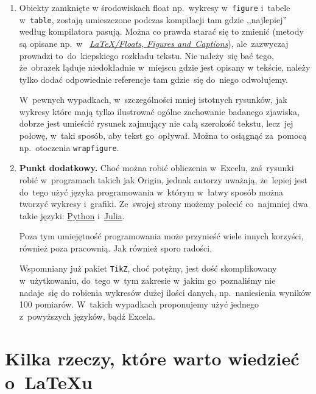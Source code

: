 \documentclass[a4paper,11pt]{article}
\begin{document}
\begin{enumerate}
\item Obiekty zamknięte w środowiskach float np.~wykresy
  w~\texttt{figure} i~tabele w~\texttt{table}, zostają umieszczone
  podczas kompilacji tam gdzie ,,najlepiej'' według kompilatora
  pasują. Można co prawda starać się to zmienić (metody są opisane
  np.~w~
  \href{https://en.wikibooks.org/wiki/LaTeX/Floats,\_Figures\_and\_Captions}{\emph{\LaTeX/Floats,
      Figures and~Captions}}), ale~zazwyczaj prowadzi to~do~kiepskiego
  rozkładu tekstu. Nie należy~się bać tego, że~obrazek ląduje
  niedokładnie w~miejscu gdzie jest opisany w tekście, należy tylko
  dodać odpowiednie referencje tam gdzie~się do~niego odwołujemy.

  W~pewnych wypadkach, w~szczególności mniej istotnych rysunków, jak
  wykresy które mają tylko ilustrować ogólne zachowanie badanego
  zjawiska, dobrze jest umieścić rysunek zajmujący nie całą szerokość
  tekstu, lecz~jej połowę, w~taki sposób, aby tekst go~opływał. Można
  to osiągnąć za~pomocą np.~otoczenia \texttt{wrapfigure}.

\item \textbf{Punkt dodatkowy.} Choć można robić obliczenia w~Excelu,
  zaś~rysunki robić w~programach takich jak Origin, jednak autorzy
  uważają, że~lepiej jest do~tego użyć języka programowania w~którym
  w~łatwy sposób można tworzyć wykresy i~grafiki. Ze~swojej strony
  możemy polecić co~najmniej dwa takie języki:
  \href{https://www.python.org/}{Python}
  i~\href{https://julialang.org/}{Julia}.

  Poza tym umiejętność programowania może przynieść wiele innych
  korzyści, również poza pracownią. Jak również sporo radości.

  Wspomniany już pakiet \texttt{TikZ}, choć potężny, jest dość
  skomplikowany w~użytkowaniu, do~tego w~tym zakresie w~jakim
  go~poznaliśmy nie nadaje~się do robienia wykresów dużej ilości
  danych, np.~naniesienia wyników 100 pomiarów. W~takich wypadkach
  proponujemy użyć jednego z~powyższych języków, bądź Excela.

\end{enumerate}





\section{Kilka rzeczy, które warto wiedzieć o~\LaTeX u}
\label{sec:kilkarzeczy}
\end{document}

